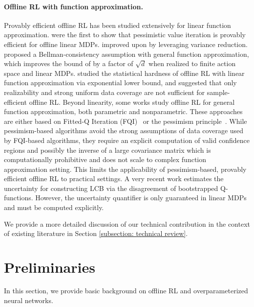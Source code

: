 \documentclass{article} \usepackage{iclr2023/iclr2023_conference,times}
\begin{document}
\paragraph{Offline RL with function approximation.} 
Provably efficient offline RL has been studied extensively for linear function approximation. \citet{jin2021pessimism} were the first to show that pessimistic value iteration is provably efficient for offline linear MDPs. \citet{Xiong2022NearlyMO,yinnear} improved upon \citet{jin2021pessimism} by leveraging variance reduction. \citet{xie2021bellman} proposed a Bellman-consistency assumption with general function approximation, which improves the bound of \citet{jin2021pessimism} by a factor of $\sqrt{d}$ when realized to finite action space and linear MDPs. \citet{wang2020statistical,zanette2021exponential} studied the statistical hardness of offline RL with linear function approximation via exponential lower bound, and \citet{foster2021offline} suggested that only realizability and strong uniform data coverage are not sufficient for sample-efficient offline RL. Beyond linearity, some works study offline RL for general function approximation, both parametric and nonparametric. These approaches are either based on Fitted-Q Iteration (FQI)~\citep{DBLP:journals/jmlr/MunosS08, DBLP:conf/icml/0002VY19, chen2019information, duan2021risk, duan2021optimal, hu2021fast, nguyentang2021sample} or the pessimism principle~\citep{uehara2021pessimistic,nguyen2021offline,jin2021pessimism}. While pessimism-based algorithms avoid the strong assumptions of data coverage used by FQI-based algorithms, they require an explicit computation of valid confidence regions and possibly the inverse of a large covariance matrix which is computationally prohibitive and does not scale to complex function approximation setting. This limits the applicability of pessimism-based, provably efficient offline RL to practical settings. A very recent work \cite{bai2022pessimistic} estimates the uncertainty for constructing LCB via the disagreement of bootstrapped Q-functions. However, the uncertainty quantifier is only guaranteed in linear MDPs and must be computed explicitly. 

We provide a more detailed discussion of our technical contribution in the context of existing literature in Section \ref{subsection: technical review}.










%
 \section{Preliminaries}
\label{section: preliminary}
In this section, we provide basic background on offline RL and overparameterized neural networks. 
\end{document}
